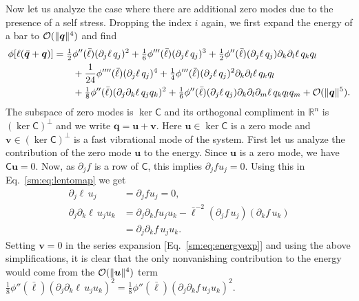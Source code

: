 Now let us analyze the case where there are additional zero modes due to the presence of a self stress.
Dropping the index $i$ again, we first expand the energy of a bar to $\mathcal{O}(\lVert\bm{q}\rVert^4)$ and find
%
\begin{equation}
  \begin{aligned}
    \phi[\ell(\bar{\bm{q}} + \bm{q})] &=
    \tfrac{1}{2}\phi''(\bar{\ell})(\partial_j \ell\,q_j)^2 +
    \tfrac{1}{6}\phi'''(\bar{\ell})(\partial_j \ell\,q_j)^3 +
    \tfrac{1}{2}\phi''(\bar{\ell})(\partial_j \ell\,q_j)\partial_k\partial_l \ell\, q_k q_l\\ &\qquad+
    \frac{1}{24}\phi''''(\bar{\ell})(\partial_j \ell\,q_j)^4 +
    \tfrac{1}{4}\phi'''(\bar{\ell})(\partial_j \ell\,q_j)^2 \partial_k \partial_l \ell\, q_k q_l\\ &\qquad+
    \tfrac{1}{8}\phi''(\bar{\ell})(\partial_j\partial_k \ell\, q_j q_k)^2 +
    \tfrac{1}{6}\phi''(\bar{\ell})(\partial_j \ell\, q_j)\partial_k\partial_l\partial_m \ell\, q_k q_l q_m + \mathcal{O}(\lVert\bm{q}\rVert^5).
  \end{aligned}
  \label{sm:eq:energyexp}
\end{equation}
%
The subspace of zero modes is $\ker\mathsf{C}$ and its orthogonal compliment in $\mathbb{R}^n$ is $(\ker\mathsf{C})^\perp$ and we write $\bm{q} = \bm{u} + \bm{v}$.
Here $\bm{u} \in \ker\mathsf{C}$ is a zero mode and $\bm{v} \in (\ker\mathsf{C})^{\perp}$ is a fast vibrational mode of the system.
First let us analyze the contribution of the zero mode $\bm{u}$ to the energy.
Since $\bm{u}$ is a zero mode, we have $\mathsf{C}\bm{u} = 0$.
Now, as $\partial_j f$ is a row of $\mathsf{C}$, this implies $\partial_j f u_j = 0$.
Using this in Eq.~\eqref{sm:eq:lentomap} we get
%
\begin{equation}
  \begin{aligned}
    \partial_j \ell\,u_j &= \partial_j f u_j=0,\\
    \partial_j \partial_k \ell\, u_j u_k
                        &= \partial_j\partial_k f u_j u_k - \bar{\ell}^{-2}(\partial_j f\, u_j) (\partial_k f\, u_k)\\
                        &= \partial_j\partial_k f\, u_j u_k.
  \end{aligned}
\end{equation}
%
Setting $\bm{v} = 0$ in the series expansion [Eq.~\eqref{sm:eq:energyexp}] and using the above simplifications, it is clear that the only nonvanishing contribution to the energy would come from the $\mathcal{O}(\lVert\bm{u}\rVert^4)$ term $\tfrac{1}{8}{\phi''(\bar{\ell})}(\partial_j \partial_k \ell\, u_j u_k)^2 = \tfrac{1}{8}{\phi''(\bar{\ell})}(\partial_j \partial_k f\, u_j u_k)^2$.


